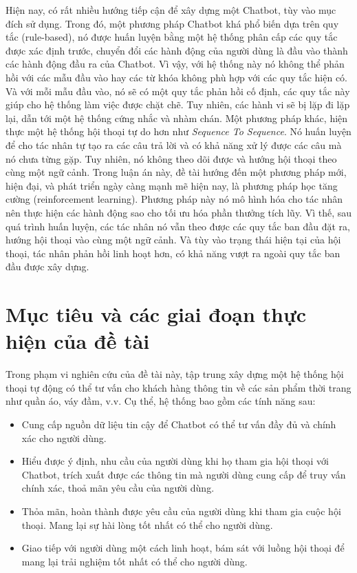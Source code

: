 Hiện nay, có rất nhiều hướng tiếp cận để xây dựng một Chatbot, tùy vào mục đích sử dụng. Trong đó, một phương pháp Chatbot khá phổ biến dựa trên quy tắc (rule-based), nó được huấn luyện bằng một hệ thống phân cấp các quy tắc được xác định trước, chuyển đổi các hành động của người dùng là đầu vào thành các hành động đầu ra của Chatbot. Vì vậy, với hệ thống này nó không thể phản hồi với các mẫu đầu vào hay các từ khóa không phù hợp với các quy tắc hiện có. Và với mỗi mẫu đầu vào, nó sẽ có một quy tắc phản hồi cố định, các quy tắc này giúp cho hệ thống làm việc được chặt chẽ. Tuy nhiên, các hành vi sẽ bị lặp đi lặp lại, dẫn tới một hệ thống cứng nhắc và nhàm chán. Một phương pháp khác, hiện thực một hệ thống hội thoại tự do hơn như \textit{Sequence To Sequence}. Nó huấn luyện để cho tác nhân tự tạo ra các câu trả lời và có khả năng xử lý được các câu mà nó chưa từng gặp. Tuy nhiên, nó không theo dõi được và hướng hội thoại theo cùng một ngữ cảnh. Trong luận án này, đề tài hướng đến một phương pháp mới, hiện đại, và phát triển ngày càng mạnh mẽ hiện nay, là phương pháp học tăng cường (reinforcement learning). Phương pháp này nó mô hình hóa cho tác nhân nên thực hiện các hành động sao cho tối ưu hóa phần thưởng tích lũy. Vì thế, sau quá trình huấn luyện, các tác nhân nó vẫn theo được các quy tắc ban đầu đặt ra, hướng hội thoại vào cùng một ngữ cảnh. Và tùy vào trạng thái hiện tại của hội thoại, tác nhân phản hồi linh hoạt hơn, có khả năng vượt ra ngoài quy tắc ban đầu được xây dựng.

\section{Mục tiêu và các giai đoạn thực hiện của đề tài}
\label{sec:muctieu}
Trong phạm vi nghiên cứu của đề tài này, tập trung xây dựng một hệ thống hội thoại tự động có thể tư vấn cho khách hàng thông tin về các sản phẩm thời trang như quần áo, váy đầm, v.v. Cụ thể, hệ thống bao gồm các tính năng sau:

\begin{itemize}
    \item Cung cấp nguồn dữ liệu tin cậy để Chatbot có thể tư vấn đầy đủ và chính xác cho người dùng.
    \item Hiểu được ý định, nhu cầu của người dùng khi họ tham gia hội thoại với Chatbot, trích xuất được các thông tin mà người dùng cung cấp để truy vấn chính xác, thoả mãn yêu cầu của người dùng.
    \item Thỏa mãn, hoàn thành được yêu cầu của người dùng khi tham gia cuộc hội thoại. Mang lại sự hài lòng tốt nhất có thể cho người dùng.
    \item Giao tiếp với người dùng một cách linh hoạt, bám sát với luồng hội thoại để mang lại trải nghiệm tốt nhất có thể cho người dùng.
\end{itemize}

